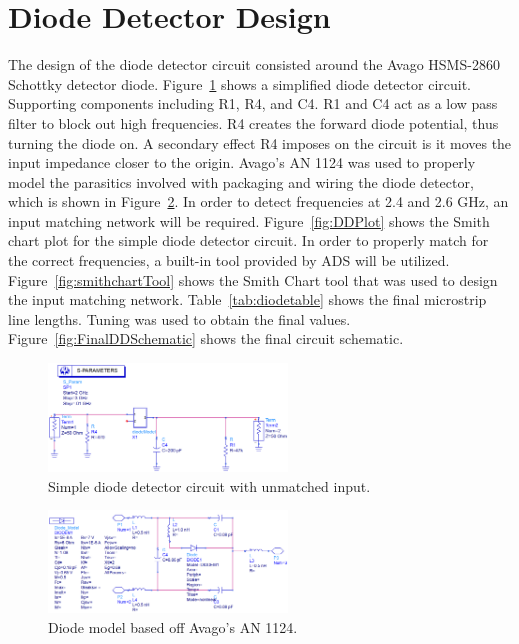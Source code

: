 \documentclass[conference]{IEEEtran}
\begin{document}
\section{Diode Detector Design}
The design of the diode detector circuit consisted around the Avago HSMS-2860 Schottky detector diode. Figure~\ref{fig:DDSchematic} shows a simplified diode detector circuit. Supporting components including R1, R4, and C4. R1 and C4 act as a low pass filter to block out high frequencies. R4 creates the forward diode potential, thus turning the diode on. A secondary effect R4 imposes on the circuit is it moves the input impedance closer to the origin. Avago's AN 1124\cite{an1124} was used to properly model the parasitics involved with packaging and wiring the diode detector, which is shown in Figure~\ref{fig:diodeModel}. In order to detect frequencies at 2.4 and 2.6 GHz, an input matching network will be required. Figure~\ref{fig:DDPlot} shows the Smith chart plot for the simple diode detector circuit. In order to properly match for the correct frequencies, a built-in tool provided by ADS will be utilized. Figure~\ref{fig:smithchartTool} shows the Smith Chart tool that was used to design the input matching network. Table~\ref{tab:diodetable} shows the final microstrip line lengths. Tuning was used to obtain the final values. Figure~\ref{fig:FinalDDSchematic} shows the final circuit schematic. 

\begin{figure}[!htb]
\centering
\includegraphics[width=2.5in]{diode-pics/diodedetectorSimplifiedSchematic.png}
\caption{Simple diode detector circuit with unmatched input.}
\label{fig:DDSchematic}
\end{figure}

\begin{figure}[!htb]
\centering
\includegraphics[width=2.5in]{diode-pics/diodedetectormodel.png}
\caption{Diode model based off Avago's AN 1124.}
\label{fig:diodeModel}
\end{figure}
\end{document}
